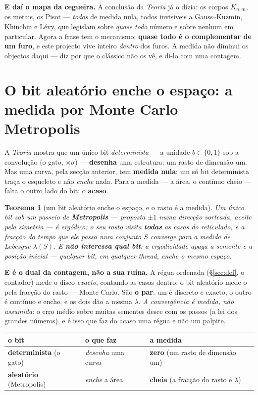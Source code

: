 \documentclass[11pt,a4paper]{article}
\newtheorem{teorema}{Teorema}
\begin{document}
\smallskip
\noindent \textbf{E daí o mapa da cegueira.} A conclusão da \emph{Teoria} já o dizia: os corpos
$K_{n,m}$, os metais, os Pisot --- \emph{todos} de medida nula, todos invisíveis a Gauss--Kuzmin,
Khinchin e Lévy, que legislam sobre \emph{quase todo} número e sobre nenhum em particular. Agora a
frase tem o mecanismo: \textbf{quase todo é o complementar de um furo}, e este projecto vive
inteiro \emph{dentro} dos furos. A medida não diminui os objectos daqui --- diz por que o clássico
não os vê, e di-lo com uma contagem.

\section{O bit aleatório enche o espaço: a medida por Monte Carlo--Metropolis}\label{sec:metropolis}

A \emph{Teoria} mostra que um único bit \emph{determinista} --- a unidade $b\in\{0,1\}$ sob a
convolução (o gato, $\times\sigma$) --- \textbf{desenha} uma estrutura: um rasto de dimensão um. Mas
uma curva, pela secção anterior, tem \textbf{medida nula}: um só bit determinista traça o esqueleto e
não \emph{enche} nada. Para a medida --- a área, o contínuo cheio --- falta o outro lado do bit: o
\textbf{acaso}.

\begin{teorema}[um bit aleatório enche o espaço, e o rasto é a medida]\label{thm:metropolis}
Um único bit sob um passeio de \textbf{Metropolis} --- proposta $\pm1$ numa direcção sorteada, aceite
pela simetria --- é \emph{ergódico}: o seu rasto visita \textbf{todas} as casas do reticulado, e a
fracção do tempo que ele passa num conjunto $S$ converge para a medida de Lebesgue $\lambda(S)$. E
\textbf{não interessa qual bit}: a ergodicidade apaga a semente e a posição inicial --- qualquer bit,
em qualquer \emph{thread}, enche o mesmo espaço.
\end{teorema}

\noindent \textbf{E é o dual da contagem, não a sua ruína.} A régua ordenada (\S\ref{sec:def}, o
contador) mede o disco \emph{exacto}, contando as casas dentro; o bit aleatório mede-o pela fracção do
rasto --- Monte Carlo. São \textbf{o par}: um é discreto e exacto, o outro é contínuo e enche, e os
dois dão a mesma $\lambda$. \emph{A convergência é medida, não assumida}: o erro médio sobre muitas
sementes desce com os passos (a lei dos grandes números), e é isso que faz do acaso uma régua e não um
palpite.

\begin{center}\small
\begin{tabular}{@{}lll@{}}
\toprule
o bit & o que faz & a medida \\
\midrule
\textbf{determinista} (o gato) & \emph{desenha} uma curva & \textbf{zero} (um rasto de dimensão um) \\
\textbf{aleatório} (Metropolis) & \emph{enche} a área & \textbf{cheia} (a fracção do rasto é $\lambda$) \\
\bottomrule
\end{tabular}
\end{center}
\end{document}
